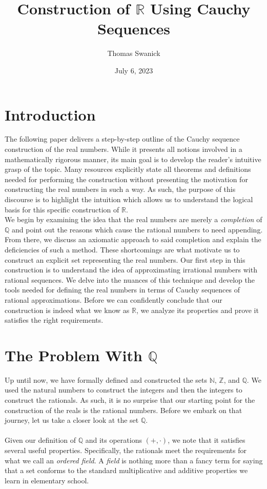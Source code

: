 \documentclass[12pt]{article}
\title{Construction of $\mathbb{R}$ Using Cauchy Sequences}
\author{Thomas Swanick}
\date{July 6, 2023}
\theoremstyle{definition}
\theoremstyle{remark}
\begin{document}
	
	\maketitle
	
	\tableofcontents %
 \section{Introduction}
 The following paper delivers a step-by-step outline of the Cauchy sequence construction of the real numbers. While it  presents all notions involved in a mathematically rigorous manner, its main goal is to develop the reader's intuitive grasp of the topic. Many resources explicitly state all theorems and definitions needed for performing the construction without presenting the motivation for constructing the real numbers in such a way. As such, the purpose of this discourse is to highlight the intuition which allows us to understand the logical basis for this specific construction of $\mathbb{R}$.\\
 
\noindent We begin by examining the idea that the real numbers are merely a \textit{completion} of $\mathbb{Q}$ and point out the reasons which cause the rational numbers to need appending. From there, we discuss an axiomatic approach to said completion and explain the deficiencies of such a method. These shortcomings are what motivate us to construct an explicit set representing the real numbers. Our first step in this construction is to understand the idea of approximating irrational numbers with rational sequences. We delve into the nuances of this technique and develop the tools needed for defining the real numbers in terms of Cauchy sequences of rational approximations. Before we can confidently conclude that our construction is indeed what we know as $\mathbb{R}$, we analyze its properties and prove it satisfies the right requirements.

 \section{The Problem With $\mathbb{Q}$}
 Up until now, we have formally defined and constructed the sets $\mathbb{N}$, $\mathbb{Z}$, and $\mathbb{Q}$. We used the natural numbers to construct the integers and then the integers to construct the rationals. As such, it is no surprise that our starting point for the construction of the reals is the rational numbers. Before we embark on that journey, let us take a closer look at the set $\mathbb{Q}$.\\\\ 
  \noindent Given our definition of $\mathbb{Q}$ and its operations $(+,\cdot)$, we note that it satisfies several useful properties. Specifically, the rationals meet the requirements for what we call an \textit{ordered field}. A \textit{field} is nothing more than a fancy term for saying that a set conforms to the standard multiplicative and additive properties we learn in elementary school.\\
  
\end{document}
